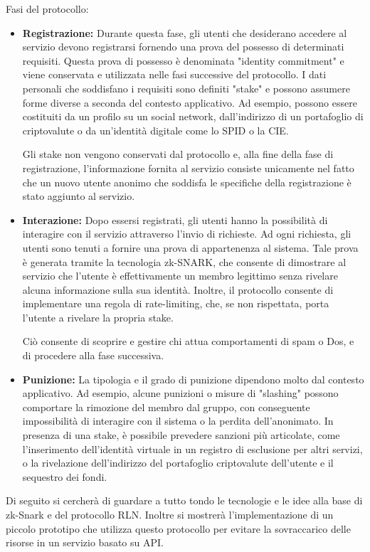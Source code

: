 Fasi del protocollo:\par
\begin{itemize}
    \item \textbf{Registrazione:} Durante questa fase, gli utenti che desiderano accedere al servizio devono registrarsi fornendo una prova del possesso di determinati requisiti. Questa prova di possesso è denominata "identity commitment" e viene conservata e utilizzata nelle fasi successive del protocollo. I dati personali che soddisfano i requisiti sono definiti "stake" e possono assumere forme diverse a seconda del contesto applicativo. Ad esempio, possono essere costituiti da un profilo su un social network, dall'indirizzo di un portafoglio di criptovalute o da un'identità digitale come lo SPID o la CIE. 

    Gli stake non vengono conservati dal protocollo e, alla fine della fase di registrazione, l'informazione fornita al servizio consiste unicamente nel fatto che un nuovo utente anonimo che soddisfa le specifiche della registrazione è stato aggiunto al servizio.\par
    
    \item \textbf{Interazione:} Dopo essersi registrati, gli utenti hanno la possibilità di interagire con il servizio attraverso l'invio di richieste. Ad ogni richiesta, gli utenti sono tenuti a fornire una prova di appartenenza al sistema. Tale prova è generata tramite la tecnologia zk-SNARK, che consente di dimostrare al servizio che l'utente è effettivamente un membro legittimo senza rivelare alcuna informazione sulla sua identità. Inoltre, il protocollo consente di implementare una regola di rate-limiting, che, se non rispettata, porta l'utente a rivelare la propria stake. 
    
    Ciò consente di scoprire e gestire chi attua comportamenti di spam o Dos, e di procedere alla fase successiva.

    \item \textbf{Punizione:} La tipologia e il grado di punizione dipendono molto dal contesto applicativo. Ad esempio, alcune punizioni o misure di "slashing" possono comportare la rimozione del membro dal gruppo, con conseguente impossibilità di interagire con il sistema o la perdita dell'anonimato. In presenza di una stake, è possibile prevedere sanzioni più articolate, come l'inserimento dell'identità virtuale in un registro di esclusione per altri servizi, o la rivelazione dell'indirizzo del portafoglio criptovalute dell'utente e il sequestro dei fondi.
   
\end{itemize}
 Di seguito si cercherà di guardare a tutto tondo le tecnologie e le idee alla base di zk-Snark e del protocollo RLN. Inoltre si mostrerà l'implementazione di un piccolo prototipo che utilizza questo protocollo per evitare la sovraccarico delle risorse in un servizio basato su API.
